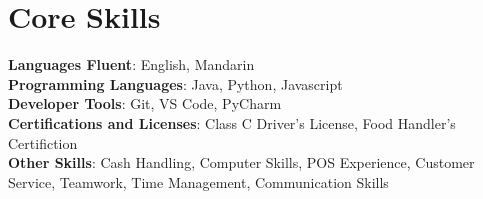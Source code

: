 \documentclass[letterpaper,11pt]{article}
\begin{document}
%
\section{Core Skills}
 \begin{itemize}[leftmargin=0.15in, label={}]
    \small{\item{
     \textbf{Languages Fluent}{: English, Mandarin} \\
     \textbf{Programming Languages}{: Java, Python, Javascript} \\
     \textbf{Developer Tools}{: Git, VS Code, PyCharm} \\
     \textbf{Certifications and Licenses}{: Class C Driver's License, Food Handler's Certifiction} \\
     \textbf{Other Skills}{: Cash Handling, Computer Skills, POS Experience, Customer Service, Teamwork, Time Management, Communication Skills} \\
    }}
 \end{itemize}


\end{document}
